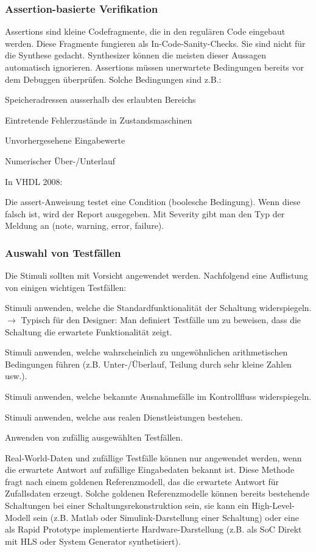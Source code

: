 \subsubsection{Assertion-basierte Verifikation}
Assertions sind kleine Codefragmente, die in den regulären Code eingebaut werden. Diese Fragmente fungieren als In-Code-Sanity-Checks. Sie sind nicht für die Synthese gedacht. Synthesizer können die meisten dieser Aussagen automatisch ignorieren.
Assertions müssen unerwartete Bedingungen bereits vor dem Debuggen überprüfen. Solche Bedingungen sind z.B.:
\begin{compactitem}
    \item Speicheradressen ausserhalb des erlaubten Bereichs
    \item Eintretende Fehlerzustände in Zustandsmaschinen
    \item Unvorhergesehene Eingabewerte
    \item Numerischer Über-/Unterlauf
\end{compactitem}

In VHDL 2008:

Die assert-Anweisung testet eine Condition (boolesche Bedingung). Wenn diese falsch ist, wird der Report ausgegeben. Mit Severity gibt man den Typ der Meldung an (note, warning, error, failure).

\subsubsection{Auswahl von Testfällen}
Die Stimuli sollten mit Vorsicht angewendet werden. Nachfolgend eine Auflistung von einigen wichtigen Testfällen:
\begin{compactitem}
    \item Stimuli anwenden, welche die Standardfunktionalität der Schaltung widerspiegeln. $\rightarrow$ Typisch für den Designer: Man definiert Testfälle um zu beweisen, dass die Schaltung die erwartete Funktionalität zeigt.
    \item Stimuli anwenden, welche wahrscheinlich zu ungewöhnlichen arithmetischen Bedingungen führen (z.B. Unter-/Überlauf, Teilung durch sehr kleine Zahlen usw.).
    \item Stimuli anwenden, welche bekannte Ausnahmefälle im Kontrollfluss widerspiegeln.
    \item Stimuli anwenden, welche aus realen Dienstleistungen bestehen.
    \item Anwenden von zufällig ausgewählten Testfällen.
\end{compactitem}
Real-World-Daten und zufällige Testfälle können nur angewendet werden, wenn die erwartete Antwort auf zufällige Eingabedaten bekannt ist. Diese Methode fragt nach einem goldenen Referenzmodell, das die erwartete Antwort für Zufallsdaten erzeugt. Solche goldenen Referenzmodelle können bereits bestehende Schaltungen bei einer Schaltungsrekonstruktion sein, sie kann ein High-Level-Modell sein (z.B. Matlab oder Simulink-Darstellung einer Schaltung) oder eine als Rapid Prototype implementierte Hardware-Darstellung (z.B. als SoC Direkt mit HLS oder System Generator synthetisiert).


